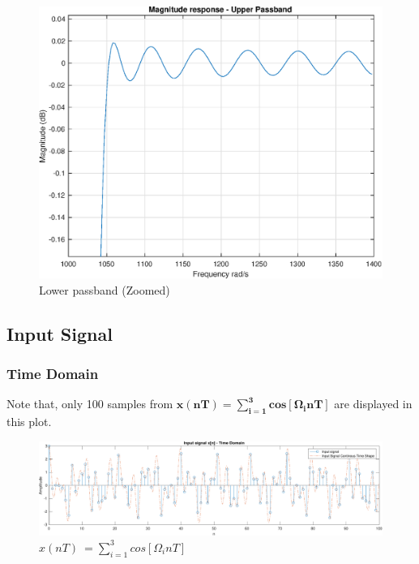 \documentclass[11pt]{article}
\begin{document}
\begin{figure}[H]
    \centering
    \includegraphics[width=0.7\linewidth]{lpassband.eps}
    \caption{Lower passband (Zoomed)}
    \label{fig:Figure10}
\end{figure}



\subsection{Input Signal}

\subsubsection{Time Domain}
Note that, only 100 samples from $\mathbf{x( nT)=\sum ^{3}_{i=1} cos[ \Omega _{i} nT]}$ are displayed in this plot.
\begin{figure}[H]
    \centering
    \includegraphics[scale=0.58]{input} 
    \caption{$x( nT) \ =\sum ^{3}_{i=1} cos[ \Omega _{i} nT]$}
\end{figure}
\end{document}
